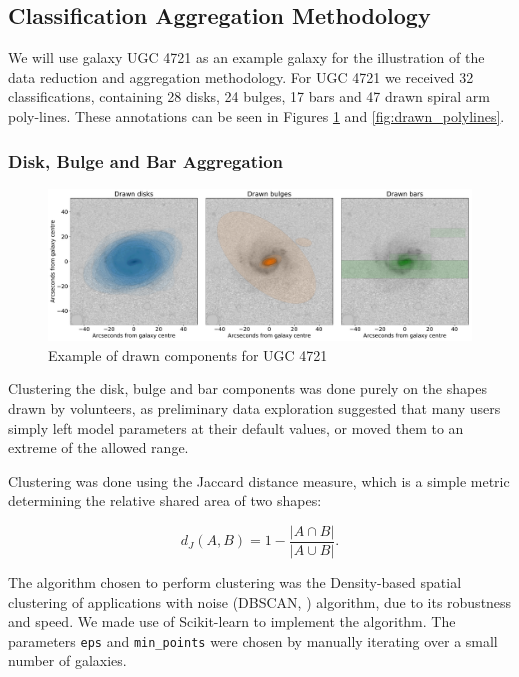 \documentclass[../main.tex]{subfiles}
\begin{document}
\subsection{Classification Aggregation Methodology}

We will use galaxy UGC 4721 as an example galaxy for the illustration of the data reduction and aggregation methodology. For UGC 4721 we received 32 classifications, containing 28 disks, 24 bulges, 17 bars and 47 drawn spiral arm poly-lines. These annotations can be seen in Figures \ref{fig:drawn_shapes} and \ref{fig:drawn_polylines}.

\subsubsection{Disk, Bulge and Bar Aggregation}

\begin{figure}
  \includegraphics[width=15cm]{images__results/drawn_shapes.pdf}
  \caption{Example of drawn components for UGC 4721}
  \label{fig:drawn_shapes}
\end{figure}

Clustering the disk, bulge and bar components was done purely on the shapes drawn by volunteers, as preliminary data exploration suggested that many users simply left model parameters at their default values, or moved them to an extreme of the allowed range.

Clustering was done using the Jaccard distance measure, which is a simple metric determining the relative shared area of two shapes:

\begin{equation}
d_J(A, B) = 1 - \frac{|A \cap B|}{|A \cup B|}.
\end{equation}

The algorithm chosen to perform clustering was the Density-based spatial clustering of applications with noise (DBSCAN, \citealt{dbscan}) algorithm, due to its robustness and speed. We made use of Scikit-learn \cite{scikit-learn} to implement the algorithm. The parameters \texttt{eps} and \texttt{min\_points} were chosen by manually iterating over a small number of galaxies.
\end{document}

